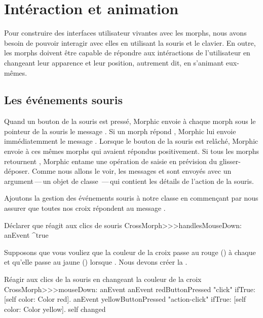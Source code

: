 \documentclass[a4paper,10pt,twoside]{book}
\begin{document}
\section{Intéraction et animation}

Pour construire des interfaces utilisateur vivantes avec les morphs,
nous avons besoin de pouvoir interagir avec elles en utilisant la
souris et le clavier.
En outre, les morphs doivent être capable de répondre aux
intéractions de l'utilisateur en changeant leur apparence et leur
position, autrement dit, en s'animant eux-mêmes.

\subsection{Les événements souris}

Quand un bouton de la souris est pressé, Morphic envoie à chaque
morph sous le pointeur de la souris le message
. Si un morph répond , Morphic lui
envoie immédiatemment le message . Lorsque
le bouton de la souris est relâché, Morphic envoie
  à ces mêmes morphs qui avaient répondus
positivement. Si tous les morphs retournent , Morphic entame
une opération de
saisie en prévision du glisser-déposer.
Comme nous allons le voir, les messages  et 
sont envoyés avec un argument\,---\,un objet de classe
\,---\,qui contient les détails de l'action de la souris.

Ajoutons la gestion des événements souris à notre classe
 en commençant par nous assurer que toutes nos
croix répondent  au message .

\begin{method}{Déclarer que  réagit aux clics de souris}
CrossMorph>>>handlesMouseDown: anEvent
	^true
\end{method}

Supposons que vous vouliez que la couleur de la croix passe au rouge
()
à chaque  et qu'elle passe au jaune
()
lorsque . 
Nous devons créer la .

\begin{method}[mouseDown]{Réagir aux clics de la souris en changeant la couleur de la croix}
CrossMorph>>>mouseDown: anEvent
	anEvent redButtonPressed "click"
		ifTrue: [self color: Color red].
	anEvent yellowButtonPressed "action-click"
		ifTrue: [self color: Color yellow].
	self changed
\end{method}
\end{document}
